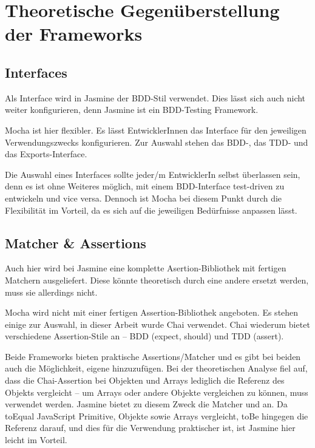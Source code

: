 \newpage
\section{Theoretische Gegenüberstellung der Frameworks}

\subsection{Interfaces}
Als Interface wird in Jasmine der BDD-Stil verwendet. Dies lässt sich auch nicht weiter konfigurieren, denn Jasmine ist ein BDD-Testing Framework.

Mocha ist hier flexibler. Es lässt EntwicklerInnen das Interface für den jeweiligen Verwendungszwecks konfigurieren. Zur Auswahl stehen das BDD-, das TDD- und das Exports-Interface.

Die Auswahl eines Interfaces sollte jeder/m EntwicklerIn selbst überlassen sein, denn es ist ohne Weiteres möglich, mit einem BDD-Interface test-driven zu entwickeln und vice versa. Dennoch ist Mocha bei diesem Punkt durch die Flexibilität im Vorteil, da es sich auf die jeweiligen Bedürfnisse anpassen lässt.

\subsection{Matcher \& Assertions}
Auch hier wird bei Jasmine eine komplette Asertion-Bibliothek mit fertigen Matchern ausgeliefert. Diese könnte theoretisch durch eine andere ersetzt werden, muss sie allerdings nicht.

Mocha wird nicht mit einer fertigen Assertion-Bibliothek angeboten. Es stehen einige zur Auswahl, in dieser Arbeit wurde Chai verwendet. Chai wiederum bietet verschiedene Assertion-Stile an -- BDD (expect, should) und TDD (assert).

Beide Frameworks bieten praktische Assertions/Matcher und es gibt bei beiden auch die Möglichkeit, eigene hinzuzufügen. Bei der theoretischen Analyse fiel auf, dass die Chai-Assertion  bei Objekten und Arrays lediglich die Referenz des Objekts vergleicht -- um Arrays oder andere Objekte vergleichen zu können, muss  verwendet werden. Jasmine bietet zu diesem Zweck die Matcher  und  an. Da toEqual JavaScript Primitive, Objekte sowie Arrays vergleicht, toBe hingegen die Referenz darauf, und dies für die Verwendung praktischer ist, ist Jasmine hier leicht im Vorteil.

